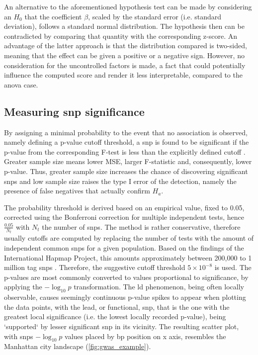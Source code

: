 An alternative to the aforementioned hypothesis test can be made by considering an $H_0$ that the coefficient $\beta$,  scaled by the standard error (i.e. standard deviation), follows a standard normal distribution. The hypothesis then can be contradicted by comparing that quantity with the corresponding z-score. An advantage of the latter approach is that the distribution compared is two-sided, meaning that the effect can be given a positive or a negative sign. However, no consideration for the uncontrolled factors is made, a fact that could potentially influence the computed score and render it less interpretable, compared to the \ac{anova} case.

\subsection{Measuring \ac{snp} significance}

By assigning a minimal probability to the event that no association is observed, namely defining a p-value cutoff threshold, a \ac{snp} is found to be significant if the p-value from the corresponding F-test is less than the explicitly defined cutoff \cite{AlejandroGonzalez-Chica2015}. Greater sample size means lower MSE, larger F-statistic and, consequently, lower p-value. Thus, greater sample size increases the chance of discovering significant \acp{snp} and low sample size raises the type I error of the detection, namely the presence of false negatives that actually confirm $H_a$.

The probability threshold is derived based on an empirical value, fixed to 0.05, corrected using the Bonferroni correction for multiple independent tests, hence $\frac{0.05}{N_t}$ with $N_t$ the number of \acp{snp}. The method is rather conservative, therefore usually cutoffs are computed by replacing the number of tests with the amount of independent common \acp{snp} for a given population. Based on the findings of the International Hapmap Project, this amounts approximately between 200,000 to 1 million tag \acp{snp} \cite{Belmont2003}. Therefore, the suggestive cutoff threshold $5\times 10 ^ {-8}$ is used. The p-values are most commonly converted to values proportional to significance, by applying the $-\log_{10}{p}$ transformation.   The \ac{ld} phenomenon, being often locally observable, causes seemingly continuous p-value spikes to appear when plotting the data points, with the lead, or functional, \ac{snp}, that is the one with the greatest local significance (i.e. the lowest locally recorded p-value), being `supported` by lesser significant \ac{snp} in its vicinity. The resulting scatter plot, with \acp{snp} $-\log_{10}{p}$ values placed by bp position on x axis, resembles the Manhattan city landscape (\autoref{fig:gwas_example}).

